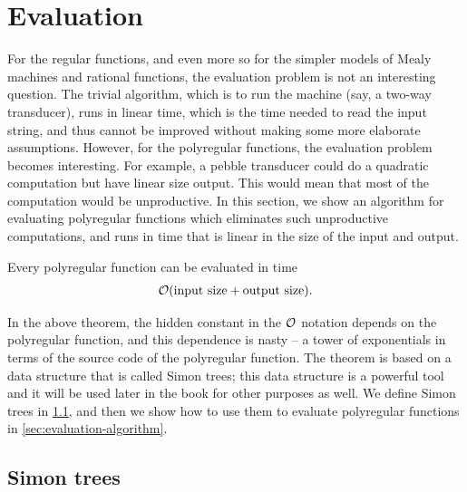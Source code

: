 \section{Evaluation}
\label{sec:evaluation}
For the regular functions, and even more so for the simpler models of Mealy machines and rational functions, the evaluation problem is not an interesting question. The trivial algorithm, which is to run the machine (say, a two-way transducer), runs in  linear time, which is the time needed to read the input string, and thus cannot be improved without making some more elaborate assumptions. However, for the polyregular functions, the evaluation problem becomes interesting. For example, a pebble transducer could do a quadratic computation but have linear size output. This would mean that most of the computation would be unproductive. In this section, we show an algorithm for evaluating polyregular functions which eliminates such unproductive computations, and runs in time that is linear in the size of the input and output.

\begin{theorem}\label{thm:evaluation-polyregular}
    Every polyregular function can be evaluated in time 
    \begin{align*}
    {\mathcal O}(\text{input size} + \text{output size}).
    \end{align*}
\end{theorem}

In the above theorem, the hidden constant in the ${\mathcal O}$ notation depends on the polyregular function, and this dependence is nasty -- a tower of exponentials in terms of the source code of the polyregular function.
The theorem is based on a data structure that is called Simon trees; this data structure is a powerful tool and it will be used later in the book for other purposes as well. We define Simon trees in \cref{sec:Simon-trees}, and then we show how to use them to evaluate polyregular functions in \cref{sec:evaluation-algorithm}.

\subsection{Simon trees}
\label{sec:Simon-trees}

